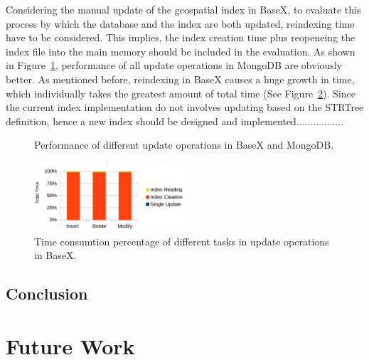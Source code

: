 \documentclass[a4paper,12pt]{article}
\begin{document}
Considering the manual update of the geospatial index in BaseX, to evaluate this process by which the database and the index are both updated, reindexing time have to be considered. This implies, the index creation time plus reopeneing the index file into the main memory should be included in the evaluation. 
As shown in Figure~\ref{figBXvsMongoUpdate}, performance of all update operations in MongoDB are obviously better. As mentioned before, reindexing in BaseX causes a huge growth in time, which individually takes the greatest amount of total time (See Figure~\ref{figBXUpdate}).  Since the current index implementation do not involves updating based on the STRTree definition, hence a new index should be designed and implemented.................
 


\begin{figure}
\centering
{}
\centering
{}
\caption{Performance of different update operations in BaseX and MongoDB.}
\label{figBXvsMongoUpdate}
\end{figure}


\begin{figure}
\centering
\includegraphics[width=0.5\textwidth]{BXUpdate.png}
\caption{Time consumtion percentage of different tasks in update operations in BaseX.}
\label{figBXUpdate}
\end{figure}

\newpage
\subsection{Conclusion}


\newpage
\section{Future Work}
\label{s.future}
\newpage


\end{document}
